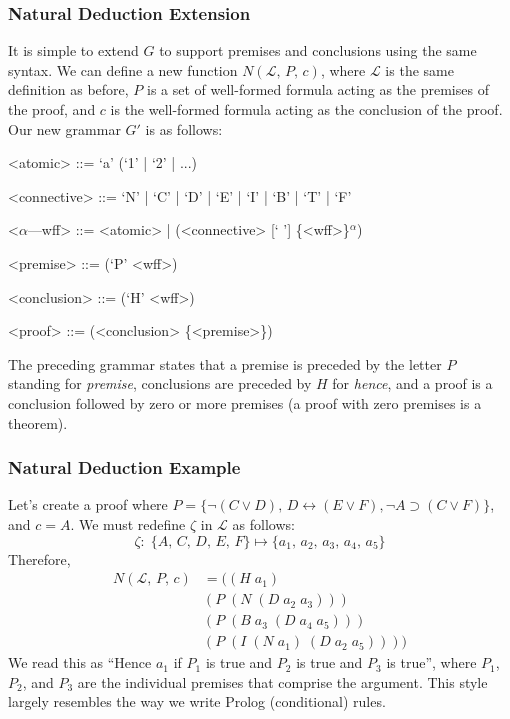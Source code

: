 \documentclass[ms]{uncgdissertationexp2}
\theoremstyle{plain}
\theoremstyle{definition}
\theoremstyle{remark}
\begin{document}
\subsubsection{Natural Deduction Extension} It is simple to extend $G$ to support premises and conclusions using the same syntax. We can define a new function $N(\mathcal{L},\,P,\,c)$, where $\mathcal{L}$ is the same definition as before, $P$ is a set of well-formed formula acting as the premises of the proof, and $c$ is the well-formed formula acting as the conclusion of the proof. Our new grammar $G'$ is as follows:
\begin{grammar}
	<atomic> ::= `a' (`1' | `2' | ...)
	
	<connective> ::= `N' | `C' | `D' | `E' | `I' | `B' | `T' | `F' 
	
	<$\alpha$---wff> ::= <atomic> | (<connective> [` '] \{<wff>\}$^{\alpha}$)
	
	<premise> ::= (`P' <wff>)
	
	<conclusion> ::= (`H' <wff>)
	
	<proof> ::= (<conclusion> \{<premise>\})
\end{grammar}
The preceding grammar states that a premise is preceded by the letter $P$ standing for \textit{premise}, conclusions are preceded by $H$ for \textit{hence}, and a proof is a conclusion followed by zero or more premises (a proof with zero premises is a theorem).\\

\subsubsection{Natural Deduction Example}
Let's create a proof where $P = \{\lnot(C \lor D),\,D \leftrightarrow (E \lor F), \lnot A \supset (C \lor F)\}$, and $c = A$. We must redefine $\zeta$ in $\mathcal{L}$ as follows:
\[
	\zeta:\;\{A,\,C,\,D,\,E,\,F\} \mapsto \{a_1,\,a_2,\,a_3,\,a_4,\,a_5\}
\]
\noindent Therefore, 
\begin{align*}
	N(\mathcal{L},\,P,\,c) & = ((H\;a_1)\;                    \\
	                     & (P\;(N\;(D\;a_2\;a_3)))            \\
	                     & (P\;(B\;a_3\;(D\;a_4\;a_5)))       \\
	                     & (P\;(I\;(N\;a_1)\;(D\;a_2\;a_5))))
\end{align*}
We read this as ``Hence $a_1$ if $P_1$ is true and $P_2$ is true and $P_3$ is true'', where $P_1$, $P_2$, and $P_3$ are the individual premises that comprise the argument. This style largely resembles the way we write Prolog (conditional) rules. 
\end{document}
